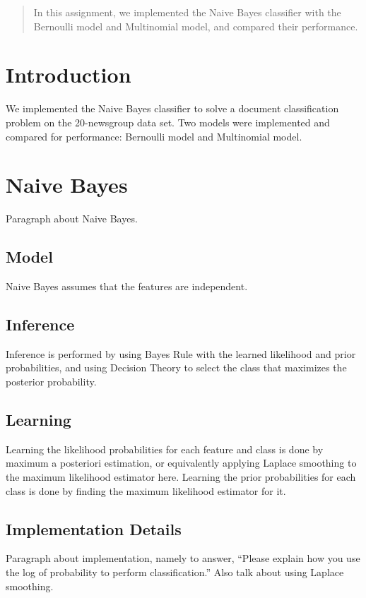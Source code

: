 \documentclass[12pt]{article}
\begin{document}
\maketitle

\begin{abstract}
In this assignment, we implemented the Naive Bayes classifier with the Bernoulli model and Multinomial model, and compared their performance.
\end{abstract}

\section{Introduction}
We implemented the Naive Bayes classifier to solve a document classification problem on the 20-newsgroup data set. Two models were implemented and compared for performance: Bernoulli model and Multinomial model.

\section{Naive Bayes}
Paragraph about Naive Bayes.

\subsection{Model}
Naive Bayes assumes that the features are independent.

\subsection{Inference}
Inference is performed by using Bayes Rule with the learned likelihood and prior probabilities, and using Decision Theory to select the class that maximizes the posterior probability.

\subsection{Learning}
Learning the likelihood probabilities for each feature and class is done by maximum a posteriori estimation, or equivalently applying Laplace smoothing to the maximum likelihood estimator here. Learning the prior probabilities for each class is done by finding the maximum likelihood estimator for it.

\subsection{Implementation Details}
Paragraph about implementation, namely to answer, ``Please explain how you use the log of probability to perform classification.'' Also talk about using Laplace smoothing.
\end{document}
